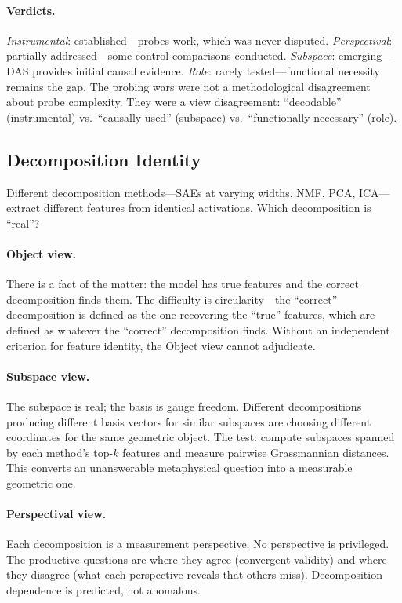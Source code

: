 \documentclass{article}
\begin{document}
\paragraph{Verdicts.}
\emph{Instrumental}: established---probes work, which was never disputed.
\emph{Perspectival}: partially addressed---some control comparisons
conducted.
\emph{Subspace}: emerging---DAS provides initial causal evidence.
\emph{Role}: rarely tested---functional necessity remains the gap.
The probing wars were not a methodological disagreement about probe
complexity. They were a view disagreement: ``decodable''
(instrumental) vs.\ ``causally used'' (subspace) vs.\ ``functionally
necessary'' (role).


\subsection{Decomposition Identity}\label{app:cs_decomp}

Different decomposition methods---SAEs at varying widths, NMF, PCA,
ICA---extract different features from identical activations. Which
decomposition is ``real''?

\paragraph{Object view.}
There is a fact of the matter: the model has true features and the
correct decomposition finds them. The difficulty is circularity---the
``correct'' decomposition is defined as the one recovering the ``true''
features, which are defined as whatever the ``correct'' decomposition
finds. Without an independent criterion for feature identity, the Object
view cannot adjudicate.

\paragraph{Subspace view.}
The subspace is real; the basis is gauge freedom. Different
decompositions producing different basis vectors for similar subspaces
are choosing different coordinates for the same geometric object. The
test: compute subspaces spanned by each method's top-$k$ features and
measure pairwise Grassmannian distances. This converts an unanswerable
metaphysical question into a measurable geometric one.

\paragraph{Perspectival view.}
Each decomposition is a measurement perspective. No perspective is
privileged. The productive questions are where they agree (convergent
validity) and where they disagree (what each perspective reveals that
others miss). Decomposition dependence is predicted, not anomalous.
\end{document}
